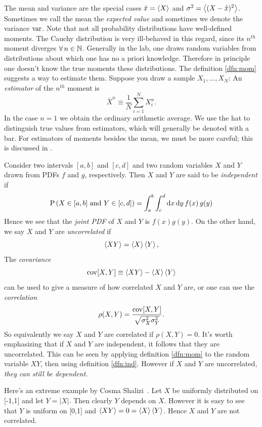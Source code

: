 The mean and variance are the special cases $\hat{x}=\ev{X}$ and 
$\sigma^2=\ev{(X-\hat{x})^2}$. Sometimes we call the mean the {\it expected
value} and sometimes we denote the variance $\operatorname{var}$. Note that not all 
probability distributions have well-defined moments. The Cauchy distribution is
very ill-behaved in this regard, since its $n^{th}$ moment diverges
$\operatorname{\forall} n\in\mathbb{N}$.
Generally in the lab, one draws random variables from distributions
about which one has no a priori knowledge. Therefore in principle one
doesn't know the true moments these distributions. The
definition \eqref{dfn:mom} suggests a way to estimate them. 
Suppose you draw a sample $X_1,...,X_N$:
  An {\it estimator} of the $n^{th}$ moment is
  \begin{equation}
    \bar{X}^n\equiv\frac{1}{N}\sum_{i=1}^N X_i^n.
  \end{equation}
In the case $n=1$ we obtain the ordinary arithmetic average.
We use the hat to distinguish true values from estimators, which will
generally be denoted with a bar. For estimators of moments besides the
mean, we must be more careful; this is discussed in .

Consider two intervals $[a,b]$ and $[c,d]$ and two random variables
$X$ and $Y$ drawn from PDFs $f$ and $g$, respectively. Then $X$ and $Y$ are
said to be {\it independent} if
\begin{equation}\label{dfn:ind}
  \operatorname{P}\left(X\in[a,b]\text{ and }Y\in[c,d]\right)=\int_a^b\int_c^d\dd{x}\dd{y}f(x)\,g(y)
\end{equation}
Hence we see that the {\it joint PDF} of $X$ and $Y$ 
is $f(x)g(y)$. On the other hand, we say $X$ and $Y$ are {\it uncorrelated} 
 if
\begin{equation}
  \ev{XY}=\ev{X}\ev{Y},
\end{equation}
The {\it covariance}
\begin{equation}\label{dfn:cov}
  \Cov[X,Y]\equiv\ev{XY}-\ev{X}\ev{Y}
\end{equation}
can be used to give a measure of how correlated $X$ and $Y$ are, or
one can use the {\it correlation}
\begin{equation}\label{dfn:cor}
  \rho(X,Y)=\frac{\operatorname{cov}[X,Y]}{\sqrt{\sigma^2_X\sigma^2_Y}}.
\end{equation}
So equivalently we say $X$ and $Y$ are correlated if $\rho(X,Y)=0$.
It's worth emphasizing that if $X$ and $Y$ are independent,
it follows that they are uncorrelated. This can be seen by applying
definition \eqref{dfn:mom} to the random variable $XY$, then using
definition \eqref{dfn:ind}. However if $X$ and $Y$ are
uncorrelated, {\it they can still be dependent}.
\begin{example*}{}{}
  Here's an extreme example by Cosma Shalizi~\cite{cosma_indep}. 
Let $X$ be uniformly distributed
  on [-1,1] and let $Y=|X|$. Then clearly $Y$ depends on $X$. However it 
  is easy to see that $Y$ is uniform on [0,1] and $\ev{XY}=0=\ev{X}\ev{Y}$. 
  Hence $X$ and $Y$ are not correlated.
\end{example*}

